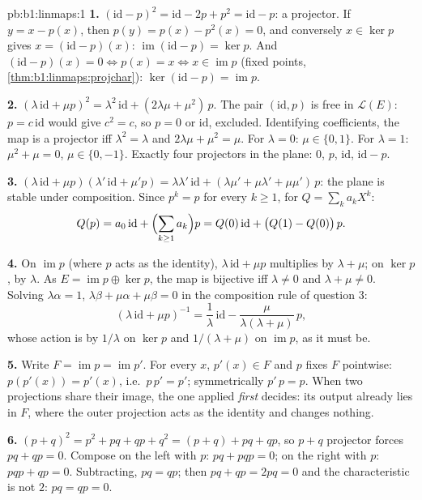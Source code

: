 \begin{solution}{pb:b1:linmaps:1}
\textbf{1.} $(\mathrm{id} - p)^2 = \mathrm{id} - 2p + p^2 =
\mathrm{id} - p$: a projector. If $y = x - p(x)$, then $p(y) =
p(x) - p^2(x) = 0$, and conversely $x \in \ker p$ gives $x =
(\mathrm{id} - p)(x)$: $\operatorname{im}(\mathrm{id} - p) = \ker
p$. And $(\mathrm{id} - p)(x) = 0 \iff p(x) = x \iff x \in
\operatorname{im} p$ (fixed points,
\cref{thm:b1:linmaps:projchar}): $\ker(\mathrm{id} - p) =
\operatorname{im} p$.

\textbf{2.} $(\lambda\,\mathrm{id} + \mu p)^2 =
\lambda^2\,\mathrm{id} + (2\lambda\mu + \mu^2)\,p$. The pair
$(\mathrm{id}, p)$ is free in $\mathcal{L}(E)$: $p = c\,
\mathrm{id}$ would give $c^2 = c$, so $p = 0$ or $\mathrm{id}$,
excluded. Identifying coefficients, the map is a projector iff
$\lambda^2 = \lambda$ and $2\lambda\mu + \mu^2 = \mu$. For
$\lambda = 0$: $\mu \in \{0, 1\}$. For $\lambda = 1$: $\mu^2 +
\mu = 0$, $\mu \in \{0, -1\}$. Exactly four projectors in the
plane: $0$, $p$, $\mathrm{id}$, $\mathrm{id} - p$.

\textbf{3.} $(\lambda\,\mathrm{id} + \mu p)(\lambda'\,\mathrm{id}
+ \mu' p) = \lambda\lambda'\,\mathrm{id} + (\lambda\mu' +
\mu\lambda' + \mu\mu')\,p$: the plane is stable under
composition. Since $p^k = p$ for every $k \geq 1$, for $Q =
\sum_k a_k X^k$:
\[
Q(p) = a_0\,\mathrm{id} + \Bigl(\sum_{k \geq 1} a_k\Bigr) p
= Q(0)\,\mathrm{id} + \bigl(Q(1) - Q(0)\bigr)\,p .
\]

\textbf{4.} On $\operatorname{im} p$ (where $p$ acts as the
identity), $\lambda\,\mathrm{id} + \mu p$ multiplies by $\lambda
+ \mu$; on $\ker p$, by $\lambda$. As $E = \operatorname{im} p
\oplus \ker p$, the map is bijective iff $\lambda \neq 0$ and
$\lambda + \mu \neq 0$. Solving $\lambda\alpha = 1$,
$\lambda\beta + \mu\alpha + \mu\beta = 0$ in the composition rule
of question 3:
\[
(\lambda\,\mathrm{id} + \mu p)^{-1}
= \frac1\lambda\,\mathrm{id} -
\frac{\mu}{\lambda(\lambda + \mu)}\,p ,
\]
whose action is by $1/\lambda$ on $\ker p$ and $1/(\lambda +
\mu)$ on $\operatorname{im} p$, as it must be.

\textbf{5.} Write $F = \operatorname{im} p = \operatorname{im}
p'$. For every $x$, $p'(x) \in F$ and $p$ fixes $F$ pointwise:
$p(p'(x)) = p'(x)$, i.e.\ $p\,p' = p'$; symmetrically $p'\,p =
p$. When two projections share their image, the one applied
\emph{first} decides: its output already lies in $F$, where the
outer projection acts as the identity and changes nothing.

\textbf{6.} $(p + q)^2 = p^2 + pq + qp + q^2 = (p + q) + pq +
qp$, so $p + q$ projector forces $pq + qp = 0$. Compose on the
left with $p$: $pq + pqp = 0$; on the right with $p$: $pqp + qp
= 0$. Subtracting, $pq = qp$; then $pq + qp = 2pq = 0$ and the
characteristic is not $2$: $pq = qp = 0$.


\end{solution}
